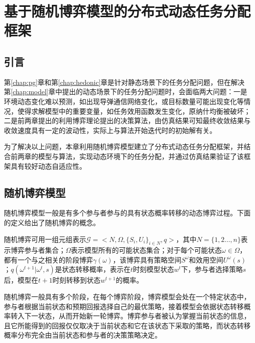 
\chapter{基于随机博弈模型的分布式动态任务分配框架}
\label{chap:stochastic}

\section{引言}
\label{sg:intro}

第\ref{chap:pg}章和第\ref{chap:hedonic}章是针对静态场景下的任务分配问题，但在解决第\ref{chap:model}章中提出的动态场景下的任务分配问题时，会面临两大问题：一是环境动态变化难以预测，如出现导弹通信网络变化，或目标数量可能出现变化等情况，使得求解模型中的重要变量，如任务效用函数发生变化，原纳什均衡被破坏；二是前两章提出的利用博弈理论提出的决策算法，由仿真结果可知最终收敛结果与收敛速度具有一定的波动性，实际上与算法开始迭代时的初始解有关。

为了解决以上问题，本章利用随机博弈模型建立了分布式动态任务分配框架，并结合前两章的模型与算法，实现动态环境下的任务分配，并通过仿真结果验证了该框架具有较好动态自适应性。

\section{随机博弈模型}
\label{sg:stochastic_game}

随机博弈模型一般是有多个参与者参与的具有状态概率转移的动态博弈过程。下面的定义给出了随机博弈的概念。

\begin{definition}[随机博弈]
	随机博弈可用一组元组表示$\mathcal{G}=<N,\Omega,\{S_i,U_i\}_{i\in N},q>$，其中$N=\{1,2\dots,n\}$表示博弈参与者集合；$\Omega$表示模型所有的可能状态集合；对于每个可能状态$\omega \in \Omega$，都有一个与之相关的阶段博弈$\gamma(\omega)$，该博弈具有策略空间$S^\omega$和效用空间$U^\omega(s)$；$q(\omega^{t+1}|\omega^t,s)$是状态转移概率，表示在$t$时刻模型状态$w^t$下，参与者选择策略$s$后，模型在$t+1$时刻转移到状态$w^{t+1}$的概率。
\end{definition}

随机博弈一般具有多个阶段，在每个博弈阶段，博弈模型会处在一个特定状态中，参与者根据当前状态和预期回报选择自己的最优策略，接着模型会依据状态转移概率转入下一状态，从而开始新一轮博弈。博弈参与者被认为掌握当前状态的信息，且它所能得到的回报仅仅取决于当前状态和它在该状态下采取的策略，而状态转移概率分布完全由当前状态和参与者的决策策略决定。




